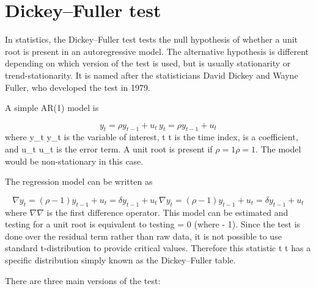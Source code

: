 \section{Dickey–Fuller test}
In statistics, the Dickey–Fuller test tests the null hypothesis of whether a unit root is present in an autoregressive model. The alternative hypothesis is different depending on which version of the test is used, but is usually stationarity or trend-stationarity. It is named after the statisticians David Dickey and Wayne Fuller, who developed the test in 1979.


A simple AR(1) model is

\[{\displaystyle y_{t}=\rho y_{t-1}+u_{t}\,} y_{t}=\rho y_{t-1}+u_{t}\,\]
where {\displaystyle y_{t}} y_{t} is the variable of interest, {\displaystyle t} t is the time index, {\displaystyle \rho } \rho  is a coefficient, and {\displaystyle u_{t}} u_{t} is the error term. A unit root is present if ${\displaystyle \rho =1} \rho =1$. The model would be non-stationary in this case.

The regression model can be written as

\[{\displaystyle \nabla y_{t}=(\rho -1)y_{t-1}+u_{t}=\delta y_{t-1}+u_{t}\,} \nabla y_{{t}}=(\rho -1)y_{{t-1}}+u_{{t}}=\delta y_{{t-1}}+u_{{t}}\,\]
where ${\displaystyle \nabla } \nabla$  is the first difference operator. This model can be estimated and testing for a unit root is equivalent to testing {\displaystyle {}} \delta = 0 (where {\displaystyle \delta \equiv {}} \delta \equiv \rho - 1). Since the test is done over the residual term rather than raw data, it is not possible to use standard t-distribution to provide critical values. Therefore this statistic {\displaystyle t} t has a specific distribution simply known as the Dickey–Fuller table.

There are three main versions of the test:

